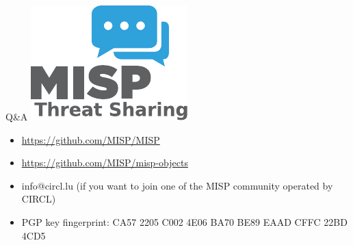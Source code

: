 \begin{frame}[t,fragile] {Q\&A}
\includegraphics[scale=0.5]{misplogo.pdf}
\begin{itemize}
        \item \url{https://github.com/MISP/MISP}
        \item \url{https://github.com/MISP/misp-objects}
        \item info@circl.lu (if you want to join one of the MISP community operated by CIRCL)
        \item PGP key fingerprint: CA57 2205 C002 4E06 BA70 BE89 EAAD CFFC 22BD 4CD5
\end{itemize}

\end{frame}


